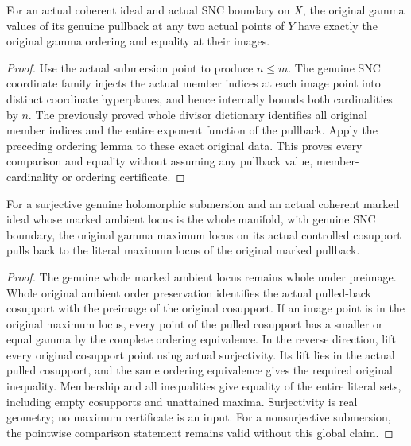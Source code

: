 \begin{lemma}
\label{hir:submersion-monomial-gamma-order}
For an actual coherent ideal and actual SNC boundary on $X$, the original
gamma values of its genuine pullback at any two actual points of $Y$
have exactly the original gamma ordering and equality at their images.
\leanok
\end{lemma}
\begin{proof}
Use the actual submersion point to produce $n\le m$. The genuine SNC
coordinate family injects the actual member indices at each image point
into distinct coordinate hyperplanes, and hence internally bounds both
cardinalities by $n$. The previously proved whole divisor dictionary
identifies all original member indices and the entire exponent function
of the pullback. Apply the preceding ordering lemma to these exact
original data. This proves every comparison and equality without assuming
any pullback value, member-cardinality or ordering certificate.
\end{proof}

\begin{lemma}
\label{hir:submersion-monomial-original-max-locus}
For a surjective genuine holomorphic submersion and an actual coherent
marked ideal whose marked ambient locus is the whole manifold, with genuine SNC boundary, the original gamma maximum locus
on its actual controlled cosupport pulls back to the literal maximum
locus of the original marked pullback.
\leanok
\end{lemma}
\begin{proof}
The genuine whole marked ambient locus remains whole under preimage.
Whole original ambient order preservation identifies the actual pulled-back
cosupport with the preimage of the original cosupport. If an image point
is in the original maximum locus, every point of the pulled cosupport
has a smaller or equal gamma by the complete ordering equivalence. In
the reverse direction, lift every original cosupport point using actual
surjectivity. Its lift lies in the actual pulled cosupport, and the same
ordering equivalence gives the required original inequality. Membership
and all inequalities give equality of the entire literal sets, including
empty cosupports and unattained maxima. Surjectivity is real geometry;
no maximum certificate is an input. For a nonsurjective submersion, the
pointwise comparison statement remains valid without this global claim.
\end{proof}
